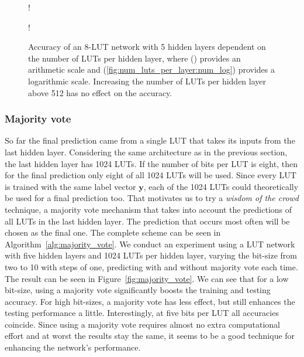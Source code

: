 \begin{figure}[!htb]
    \centering
  \begin{minipage}[b]{.45\linewidth}
     {!} {
    
    }
    \label{fig:num_luts_per_layer:num}
  \end{minipage}
  \begin{minipage}[b]{.45\linewidth}
     {!} {
    
    }
    \label{fig:num_luts_per_layer:num_log}
  \end{minipage}
  \caption{Accuracy of an 8-LUT network with 5 hidden layers dependent on the number of LUTs per hidden layer, where () provides an arithmetic scale and (\ref{fig:num_luts_per_layer:num_log}) provides a logarithmic scale. Increasing the number of LUTs per hidden layer above 512 has no effect on the accuracy.}
\label{fig:num_luts_per_layer}
\end{figure}
\FloatBarrier

\subsubsection{Majority vote} \label{sec:majority_vote}
So far the final prediction came from a single LUT that takes its inputs from the last hidden layer. Considering the same architecture as in the previous section, the last hidden layer has 1024 LUTs. If the number of bits per LUT is eight, then for the final prediction only eight of all 1024 LUTs will be used. Since every LUT is trained with the same label vector $\bm{y}$, each of the 1024 LUTs could theoretically be used for a final prediction too. That motivates us to try a \textit{wisdom of the crowd} technique, a majority vote mechanism that takes into account the predictions of all LUTs in the last hidden layer. The prediction that occurs most often will be chosen as the final one. The complete scheme can be seen in Algorithm~\ref{alg:majority_vote}. We conduct an experiment using a LUT network with five hidden layers and 1024 LUTs per hidden layer, varying the bit-size from two to 10 with steps of one, predicting with and without majority vote each time. The result can be seen in Figure~\ref{fig:majority_vote}. We can see that for a low bit-size, using a majority vote significantly boosts the training and testing accuracy. For high bit-sizes, a majority vote has less effect, but still enhances the testing performance a little. Interestingly, at five bits per LUT all accuracies coincide. Since using a majority vote requires almost no extra computational effort and at worst the results stay the same, it seems to be a good technique for enhancing the network's performance.


